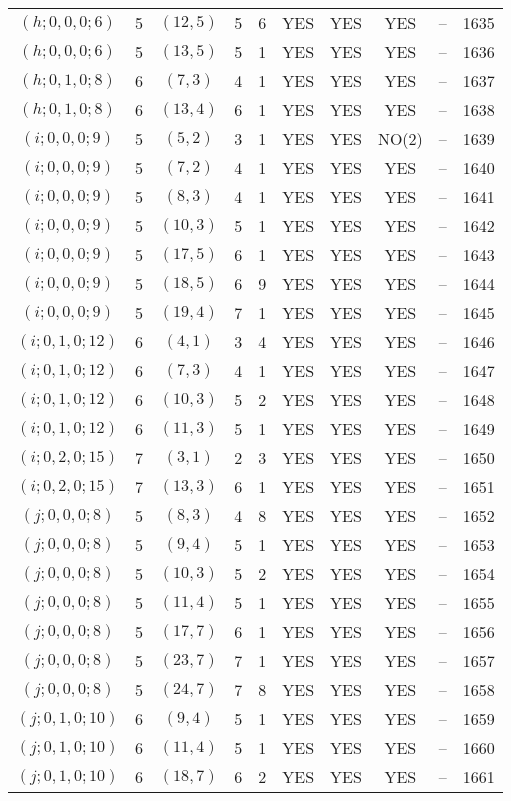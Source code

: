 \begin{longtable}{|c|c|c|c|c|c|c|c|c|c|}
$(h; 0, 0, 0; 6)$ & 5 & $(12, 5)$ & 5 & 6 & YES & YES & YES & -- & 1635\\
$(h; 0, 0, 0; 6)$ & 5 & $(13, 5)$ & 5 & 1 & YES & YES & YES & -- & 1636\\
$(h; 0, 1, 0; 8)$ & 6 & $(7, 3)$ & 4 & 1 & YES & YES & YES & -- & 1637\\
$(h; 0, 1, 0; 8)$ & 6 & $(13, 4)$ & 6 & 1 & YES & YES & YES & -- & 1638\\
$(i; 0, 0, 0; 9)$ & 5 & $(5, 2)$ & 3 & 1 & YES & YES & NO(2) & -- & 1639\\
$(i; 0, 0, 0; 9)$ & 5 & $(7, 2)$ & 4 & 1 & YES & YES & YES & -- & 1640\\
$(i; 0, 0, 0; 9)$ & 5 & $(8, 3)$ & 4 & 1 & YES & YES & YES & -- & 1641\\
$(i; 0, 0, 0; 9)$ & 5 & $(10, 3)$ & 5 & 1 & YES & YES & YES & -- & 1642\\
$(i; 0, 0, 0; 9)$ & 5 & $(17, 5)$ & 6 & 1 & YES & YES & YES & -- & 1643\\
$(i; 0, 0, 0; 9)$ & 5 & $(18, 5)$ & 6 & 9 & YES & YES & YES & -- & 1644\\
$(i; 0, 0, 0; 9)$ & 5 & $(19, 4)$ & 7 & 1 & YES & YES & YES & -- & 1645\\
$(i; 0, 1, 0; 12)$ & 6 & $(4, 1)$ & 3 & 4 & YES & YES & YES & -- & 1646\\
$(i; 0, 1, 0; 12)$ & 6 & $(7, 3)$ & 4 & 1 & YES & YES & YES & -- & 1647\\
$(i; 0, 1, 0; 12)$ & 6 & $(10, 3)$ & 5 & 2 & YES & YES & YES & -- & 1648\\
$(i; 0, 1, 0; 12)$ & 6 & $(11, 3)$ & 5 & 1 & YES & YES & YES & -- & 1649\\
$(i; 0, 2, 0; 15)$ & 7 & $(3, 1)$ & 2 & 3 & YES & YES & YES & -- & 1650\\
$(i; 0, 2, 0; 15)$ & 7 & $(13, 3)$ & 6 & 1 & YES & YES & YES & -- & 1651\\
$(j; 0, 0, 0; 8)$ & 5 & $(8, 3)$ & 4 & 8 & YES & YES & YES & -- & 1652\\
$(j; 0, 0, 0; 8)$ & 5 & $(9, 4)$ & 5 & 1 & YES & YES & YES & -- & 1653\\
$(j; 0, 0, 0; 8)$ & 5 & $(10, 3)$ & 5 & 2 & YES & YES & YES & -- & 1654\\
$(j; 0, 0, 0; 8)$ & 5 & $(11, 4)$ & 5 & 1 & YES & YES & YES & -- & 1655\\
$(j; 0, 0, 0; 8)$ & 5 & $(17, 7)$ & 6 & 1 & YES & YES & YES & -- & 1656\\
$(j; 0, 0, 0; 8)$ & 5 & $(23, 7)$ & 7 & 1 & YES & YES & YES & -- & 1657\\
$(j; 0, 0, 0; 8)$ & 5 & $(24, 7)$ & 7 & 8 & YES & YES & YES & -- & 1658\\
$(j; 0, 1, 0; 10)$ & 6 & $(9, 4)$ & 5 & 1 & YES & YES & YES & -- & 1659\\
$(j; 0, 1, 0; 10)$ & 6 & $(11, 4)$ & 5 & 1 & YES & YES & YES & -- & 1660\\
$(j; 0, 1, 0; 10)$ & 6 & $(18, 7)$ & 6 & 2 & YES & YES & YES & -- & 1661
\end{longtable}
